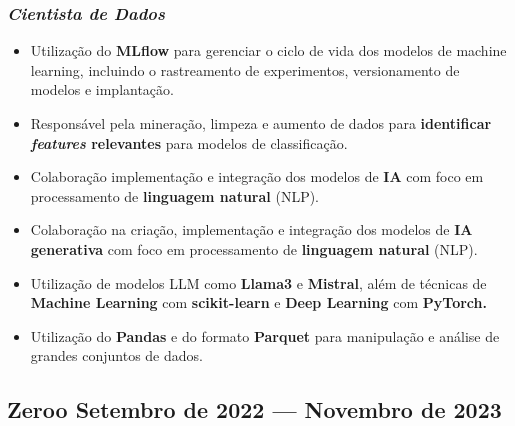 \documentclass[a4paper,12pt]{article}
\begin{document}
\subsubsection*{\normalsize \textit{Cientista de Dados}}
\vspace{-1em}
\vspace{-0.5em}
\begin{itemize}
    \item Utilização do \textbf{MLflow} para gerenciar o ciclo de vida dos modelos de machine learning, incluindo o rastreamento de experimentos, versionamento de modelos e implantação.
    \item Responsável pela mineração, limpeza e aumento de dados para \textbf{identificar \textit{features} relevantes }para modelos de classificação.
    \item Colaboração implementação e integração dos modelos de \textbf{IA} com foco em processamento de \textbf{linguagem natural} (NLP).
    \item Colaboração na criação, implementação e integração dos modelos de \textbf{IA generativa} com foco em processamento de \textbf{linguagem natural} (NLP).
    \item Utilização de modelos LLM como \textbf{Llama3} e \textbf{Mistral}, além de técnicas de 
    \textbf{Machine Learning} com\textbf{ scikit-learn} e \textbf{Deep Learning} com \textbf{PyTorch.}
    \item Utilização do \textbf{Pandas} e do formato \textbf{Parquet} para manipulação e análise de grandes conjuntos de dados.
\end{itemize}

\vspace{1.5em}
\vspace*{7pt}
\vspace{1.5em}


\subsection*{\large Zeroo \hfill Setembro de 2022 --- Novembro de 2023}
\end{document}
